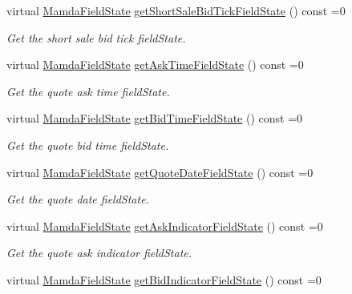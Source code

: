 \begin{CompactItemize}
virtual \hyperlink{namespaceWombat_93aac974f2ab713554fd12a1fa3b7d2a}{Mamda\-Field\-State} \hyperlink{classWombat_1_1MamdaQuoteRecap_cfcc9d7209b6d09009c084f37e2e0510}{get\-Short\-Sale\-Bid\-Tick\-Field\-State} () const =0
\begin{CompactList}\small\item\em Get the short sale bid tick field\-State. \item\end{CompactList}\item 
virtual \hyperlink{namespaceWombat_93aac974f2ab713554fd12a1fa3b7d2a}{Mamda\-Field\-State} \hyperlink{classWombat_1_1MamdaQuoteRecap_bea1b72396575311378b1b4063ab1734}{get\-Ask\-Time\-Field\-State} () const =0
\begin{CompactList}\small\item\em Get the quote ask time field\-State. \item\end{CompactList}\item 
virtual \hyperlink{namespaceWombat_93aac974f2ab713554fd12a1fa3b7d2a}{Mamda\-Field\-State} \hyperlink{classWombat_1_1MamdaQuoteRecap_c5406a153ad823049ce414a442f6a25b}{get\-Bid\-Time\-Field\-State} () const =0
\begin{CompactList}\small\item\em Get the quote bid time field\-State. \item\end{CompactList}\item 
virtual \hyperlink{namespaceWombat_93aac974f2ab713554fd12a1fa3b7d2a}{Mamda\-Field\-State} \hyperlink{classWombat_1_1MamdaQuoteRecap_475b6c9bd5ed474b3ac1e463cf199d8c}{get\-Quote\-Date\-Field\-State} () const =0
\begin{CompactList}\small\item\em Get the quote date field\-State. \item\end{CompactList}\item 
virtual \hyperlink{namespaceWombat_93aac974f2ab713554fd12a1fa3b7d2a}{Mamda\-Field\-State} \hyperlink{classWombat_1_1MamdaQuoteRecap_b788be211493a7091449796df22c6173}{get\-Ask\-Indicator\-Field\-State} () const =0
\begin{CompactList}\small\item\em Get the quote ask indicator field\-State. \item\end{CompactList}\item 
virtual \hyperlink{namespaceWombat_93aac974f2ab713554fd12a1fa3b7d2a}{Mamda\-Field\-State} \hyperlink{classWombat_1_1MamdaQuoteRecap_ff522048df5c7fe409315f4d694ddaca}{get\-Bid\-Indicator\-Field\-State} () const =0

\end{CompactItemize}

